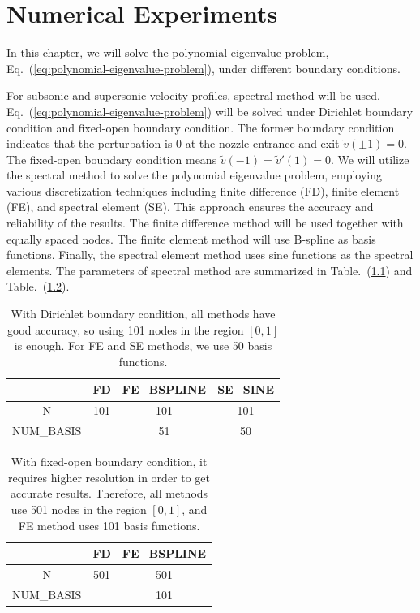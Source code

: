 \chapter{Numerical Experiments} \label{chap:numerical-experiments}
In this chapter, we will solve the polynomial eigenvalue problem, Eq.~(\ref{eq:polynomial-eigenvalue-problem}), under different boundary conditions.

For subsonic and supersonic velocity profiles, spectral method will be used. Eq.~(\ref{eq:polynomial-eigenvalue-problem}) will be solved under Dirichlet boundary condition and fixed-open boundary condition. The former boundary condition indicates that the perturbation is 0 at the nozzle entrance and exit $\tilde{v}(\pm 1)=0$. The fixed-open boundary condition means $\tilde{v}(-1)=\tilde{v}'(1) = 0$. We will utilize the spectral method to solve the polynomial eigenvalue problem, employing various discretization techniques including finite difference (FD), finite element (FE), and spectral element (SE). This approach ensures the accuracy and reliability of the results. The finite difference method will be used together with equally spaced nodes. The finite element method will use B-spline as basis functions. Finally, the spectral element method uses sine functions as the spectral elements. The parameters of spectral method are summarized in Table.~(\ref{table:parameters-dirichlet}) and Table.~(\ref{table:parameters-fixed-open}).
\begin{table} [H]
	\centering
	\caption{With Dirichlet boundary condition, all methods have good accuracy, so using 101 nodes in the region $[0,1]$ is enough. For FE and SE methods, we use 50 basis functions.}
	\begin{tabular}{|c|c|c|c|}
		\hline
		           & FD  & FE\_BSPLINE & SE\_SINE \\
		\hline
		N          & 101 & 101         & 101      \\
		\hline
		NUM\_BASIS &     & 51          & 50       \\
		\hline
	\end{tabular}
	\label{table:parameters-dirichlet}
\end{table}
\begin{table} [H]
	\centering
	\caption{With fixed-open boundary condition, it requires higher resolution in order to get accurate results. Therefore, all methods use 501 nodes in the region $[0,1]$, and FE method uses 101 basis functions.}
	\begin{tabular}{|c|c|c|}
		\hline
		           & FD  & FE\_BSPLINE \\
		\hline
		N          & 501 & 501         \\
		\hline
		NUM\_BASIS &     & 101         \\
		\hline
	\end{tabular}
	\label{table:parameters-fixed-open}
\end{table}

